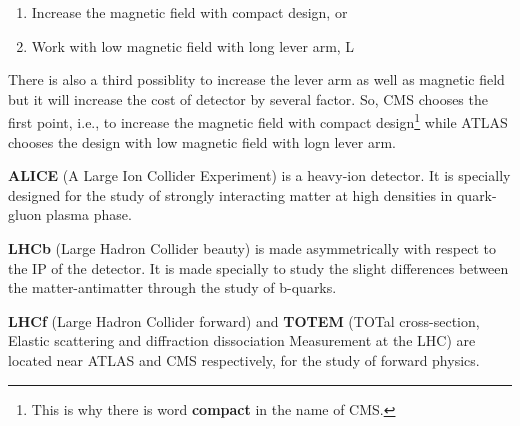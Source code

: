 \begin{enumerate}
	\item Increase the magnetic field with compact design, or
	\item Work with low magnetic field with long lever arm, L
\end{enumerate}

There is also a third possiblity to increase the lever arm as well as magnetic field but it will increase the cost of detector by several factor. So, CMS chooses the first point, i.e., to increase the magnetic field with compact design\footnote{This is why there is word {\bf compact} in the name of CMS.} while ATLAS chooses the design with low magnetic field with logn lever arm.


{\bf ALICE} (A Large Ion Collider Experiment) is a heavy-ion detector. It is specially designed for the study of strongly interacting matter at high densities in quark-gluon plasma phase.

{\bf LHCb} (Large Hadron Collider beauty) is made asymmetrically with respect to the IP of the detector. It is made specially to study the slight differences between the matter-antimatter through the study of b-quarks.

{\bf LHCf} (Large Hadron Collider forward) and {\bf TOTEM} (TOTal cross-section, Elastic scattering and diffraction dissociation Measurement at the LHC) are located near ATLAS and CMS respectively, for the study of forward physics.





